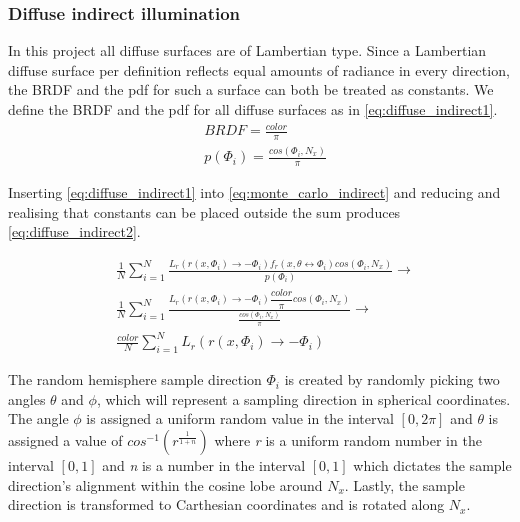 \documentclass[]{report}   %
\begin{document}
\subsubsection{Diffuse indirect illumination}
In this project all diffuse surfaces are of Lambertian type.
Since a Lambertian diffuse surface per definition reflects equal amounts of radiance in every direction, the BRDF and the pdf for such a surface can both be treated as constants.
We define the BRDF and the pdf for all diffuse surfaces as  in \autoref{eq:diffuse_indirect1}.
\begin{subequations} \label{eq:diffuse_indirect1}
\begin{align} 
	&BRDF = \frac{color}{\pi} \\
	&p(\Phi_i) = \frac{cos(\Phi_i, N_x)}{\pi}
\end{align}
\end{subequations}

Inserting \autoref{eq:diffuse_indirect1} into \autoref{eq:monte_carlo_indirect} and reducing and realising that constants can be placed outside the sum produces \autoref{eq:diffuse_indirect2}.

\begin{subequations} \label{eq:diffuse_indirect2}
\begin{align}
	&\nonumber \frac{1}{N} \sum^{N}_{i=1} \frac{L_r(r(x,\Phi_i) \rightarrow -\Phi_i) f_r(x, \theta \leftrightarrow \Phi_i)cos(\Phi_i, N_x)}{p(\Phi_i)} \rightarrow \\
	&\nonumber \frac{1}{N} \sum^{N}_{i=1} \frac{L_r(r(x,\Phi_i) \rightarrow -\Phi_i)  \dfrac{color}{\pi} cos(\Phi_i, N_x)}{\frac{cos(\Phi_i, N_x)}{\pi}} \rightarrow \\
	&\frac{color}{N} \sum^{N}_{i=1} L_r(r(x,\Phi_i) \rightarrow -\Phi_i)
\end{align}
\end{subequations}

The random hemisphere sample direction $\Phi_i$ is created by randomly picking two angles $\theta$ and $\phi$, which will represent a sampling direction in spherical coordinates.
The angle $\phi$ is assigned a uniform random value in the interval $[0,2\pi]$ and $\theta$ is assigned a value of $cos^{-1}(r^{ \frac{1}{1+n} })$ where \emph{r} is a uniform random number in the interval $[0,1]$ and \emph{n} is a number in the interval $[0,1]$ which dictates the sample direction's alignment within the cosine lobe around $N_x$. 
Lastly, the sample direction is transformed to Carthesian coordinates and is rotated along $N_x$.
\end{document}
